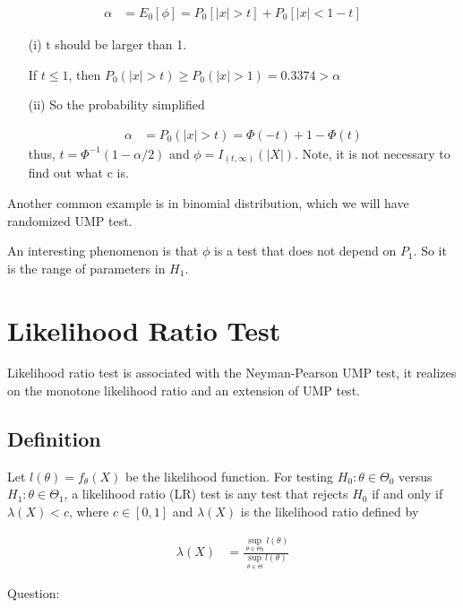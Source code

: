 \documentclass[11pt]{article} %
\begin{document}
\begin{align*}
	\alpha &= E_0[\phi] = P_0[|x| > t] + P_0[|x| < 1-t] 
\end{align*}

\begin{itemize}
\item[(i)] t should be larger than 1.

If $t \leq 1$, then $P_0(|x| > t) \geq P_0(|x| > 1) = 0.3374 > \alpha$

\item[(ii)] So the probability simplified

\begin{align*}
	\alpha &= P_0(|x| > t) = \Phi(-t) + 1 - \Phi(t)
\end{align*}
thus, $t= \Phi^{-1} (1- \alpha/2)$ and $\phi = I_{(t, \infty)} (|X|)$. 
Note, it is not necessary to find out what c is.

\end{itemize}

Another common example is in binomial distribution, which we will have randomized UMP test.

An interesting phenomenon is that $\phi$ is a test that does not depend on $P_1$. So it is the range of parameters in $H_1$.




\section{Likelihood Ratio Test}

Likelihood ratio test is associated with the Neyman-Pearson UMP test, it realizes on the monotone likelihood ratio and an extension of UMP test. 

\subsection{Definition}
Let $l(\theta) = f_{\theta}(X)$ be the likelihood function. For testing $H_0: \theta \in \Theta_0$ versus $H_1: \theta \in \Theta_1$, a likelihood ratio (LR) test is any test that rejects $H_0$
if and only if $\lambda(X) < c$, where $c \in [0,1]$ and $\lambda(X)$ is the likelihood ratio defined by

\begin{align*}
	\lambda(X) &= \frac{ \underset{\theta \in \Theta_0}{\sup} l(\theta)}{\underset{\theta \in \Theta}{\sup} l(\theta)}
\end{align*}

Question:
\end{document}
